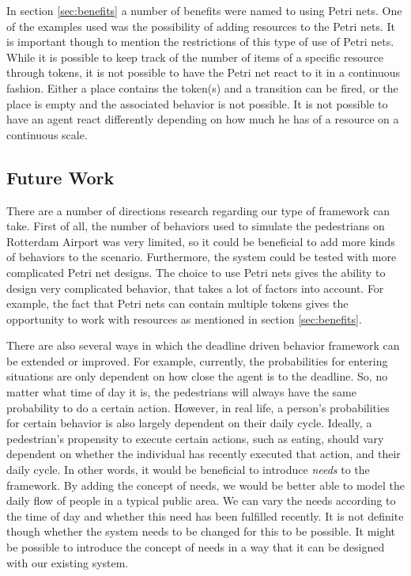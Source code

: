 \documentclass[11pt, a4paper]{book}
\begin{document}
In section \ref{sec:benefits} a number of benefits were named to using Petri nets. One of the examples used was the possibility of adding resources to the Petri nets. It is important though to mention the restrictions of this type of use of Petri nets. While it is possible to keep track of the number of items of a specific resource through tokens, it is not possible to have the Petri net react to it in a continuous fashion. Either a place contains the token(s) and a transition can be fired, or the place is empty and the associated behavior is not possible. It is not possible to have an agent react differently depending on how much he has of a resource on a continuous scale. 

\subsection{Future Work}
There are a number of directions research regarding our type of framework can take. First of all, the number of behaviors used to simulate the pedestrians on Rotterdam Airport was very limited, so it could be beneficial to add more kinds of behaviors to the scenario. Furthermore, the system could be tested with more complicated Petri net designs. The choice to use Petri nets gives the ability to design very complicated behavior, that takes a lot of factors into account. For example, the fact that Petri nets can contain multiple tokens gives the opportunity to work with resources as mentioned in section \ref{sec:benefits}.

There are also several ways in which the deadline driven behavior framework can be extended or improved. For example, currently, the probabilities for entering situations are only dependent on how close the agent is to the deadline. So, no matter what time of day it is, the pedestrians will always have the same probability to do a certain action. However, in real life, a person's probabilities for certain behavior is also largely dependent on their daily cycle. Ideally, a pedestrian's propensity to execute certain actions, such as eating, should vary dependent on whether the individual has recently executed that action, and their daily cycle. In other words, it would be beneficial to introduce \emph{needs} to the framework. By adding the concept of needs, we would be better able to model the daily flow of people in a typical public area. We can vary the needs according to the time of day and whether this need has been fulfilled recently. It is not definite though whether the system needs to be changed for this to be possible. It might be possible to introduce the concept of needs in a way that it can be designed with our existing system.
\end{document}

